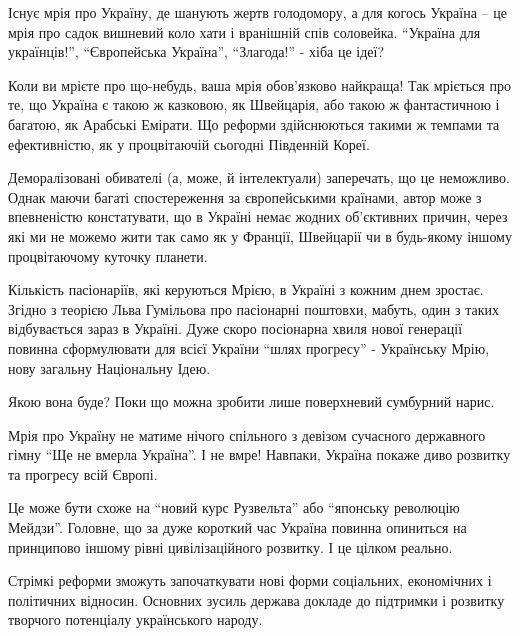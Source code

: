 \begin{multicols}{2}
Існує мрія про Україну, де шанують жертв голодомору, а для когось Україна – це
мрія про садок вишневий коло хати і вранішній спів соловейка. \enquote{Україна для
українців!}, \enquote{Європейська Україна}, \enquote{Злагода!} - хіба це ідеї?


Коли ви мрієте про що-небудь, ваша мрія обов’язково найкраща! Так мріється про
те, що Україна є такою ж казковою, як Швейцарія, або такою ж фантастичною і
багатою, як Арабські Емірати. Що реформи здійснюються такими ж темпами та
ефективністю, як у процвітаючій сьогодні Південній Кореї.

Деморалізовані обивателі (а, може, й інтелектуали) заперечать, що це неможливо.
Однак маючи багаті спостереження за європейськими країнами, автор може з
впевненістю констатувати, що в Україні немає жодних об’єктивних причин, через
які ми не можемо жити так само як у Франції, Швейцарії чи в будь-якому іншому
процвітаючому куточку планети.


Кількість пасіонаріїв, які керуються Мрією, в Україні з кожним днем зростає.
Згідно з теорією Льва Гумільова про пасіонарні поштовхи, мабуть, один з таких
відбувається зараз в Україні. Дуже скоро посіонарна хвиля нової генерації
повинна сформулювати для всієї України \enquote{шлях прогресу} - Українську Мрію, нову
загальну Національну Ідею.

Якою вона буде? Поки що можна зробити лише поверхневий сумбурний нарис.

Мрія про Україну не матиме нічого спільного з девізом сучасного державного
гімну \enquote{Ще не вмерла Україна}. І не вмре! Навпаки, Україна покаже диво розвитку
та прогресу всій Європі.

Це може бути схоже на \enquote{новий курс Рузвельта} або \enquote{японську революцію Мейдзи}.
Головне, що за дуже короткий час Україна повинна опиниться на принципово іншому
рівні цивілізаційного розвитку. І це цілком реально.

Стрімкі реформи зможуть започаткувати нові форми соціальних, економічних і
політичних відносин. Основних зусиль держава докладе до підтримки і розвитку
творчого потенціалу українського народу.


\end{multicols}

